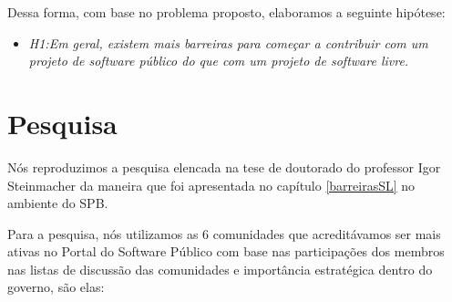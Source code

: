 Dessa forma, com base no problema proposto, elaboramos a seguinte hipótese:

\begin{itemize}
\item \emph{H1:Em geral, existem mais barreiras para começar a contribuir 
com um projeto de software público do que com um projeto de software livre.}

\end{itemize}

\section{Pesquisa}

Nós reproduzimos a pesquisa elencada na tese de doutorado do professor Igor 
Steinmacher da maneira que foi apresentada no capítulo \ref{barreirasSL} no ambiente
do SPB.

Para a pesquisa, nós utilizamos as 6 comunidades que acreditávamos ser mais ativas
no Portal do Software Público com base nas participações dos membros nas listas de 
discussão das comunidades e importância estratégica dentro do governo, são elas:

